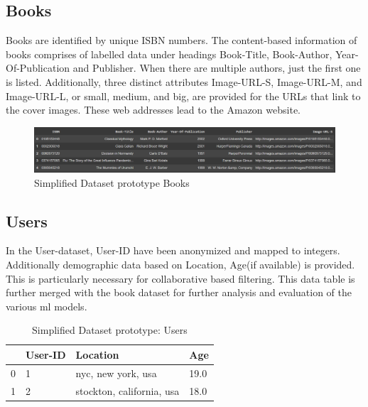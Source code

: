     \subsection{Books} 
    Books are identified by unique ISBN numbers. The content-based information of books comprises of labelled data under headings  Book-Title, Book-Author, Year-Of-Publication and Publisher.
    When there are multiple authors, just the first one is listed. Additionally, three distinct attributes  Image-URL-S, Image-URL-M, and Image-URL-L, or small, medium, and big, are provided for the URLs that link to the cover images. These web addresses lead to the Amazon website.\\
   \begin{figure}[h]
       \centering
       \includegraphics[width=150mm]{img/Graphics/books.png}
       \caption{Simplified Dataset prototype Books}
       \label{fig:enter-label}
   \end{figure}
  
    \subsection{Users}
    In the User-dataset, User-ID have been anonymized and mapped to integers. Additionally demographic data based on Location, Age(if available) is provided. This is particularly necessary for collaborative based filtering. This data table is further merged with the book dataset for further analysis and evaluation of the various ml models.\\

    \begin{table}[h]
    \centering
    \caption{Simplified Dataset prototype: Users}
    \begin{tabular}{|p{0.2in}|p{0.6in}|p{0.9in}|p{0.8in}|}
\hline
         & User-ID & Location & Age \\
        \hline
        0 & 1 & nyc, new york, usa & 19.0 \\
        1 & 2 & stockton, california, usa & 18.0\\
        \hline
    \end{tabular}
    \vspace{2 mm}
    
    \label{Simplified Dataset prototype: Users}
\end{table}

